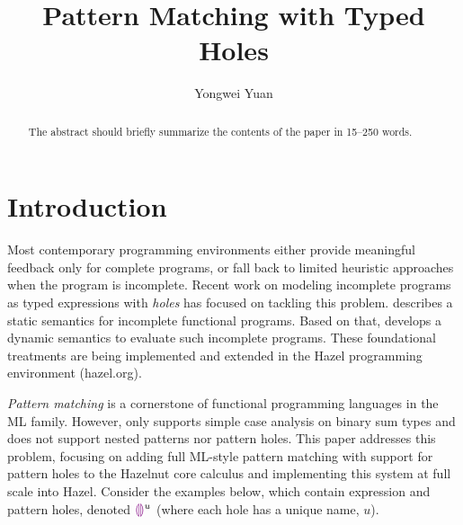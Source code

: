 \documentclass[runningheads,envcountsame,a4paper]{llncs}
\begin{document}
  
\title{Pattern Matching with Typed Holes}

\author{
  Yongwei Yuan \and 
}


\maketitle

\begin{abstract}
  The abstract should briefly summarize the contents of the paper in
  15--250 words.
  
\end{abstract}

\section{Introduction}
\label{sec:intro}
Most contemporary programming environments either provide meaningful feedback only for complete programs, or fall back to limited heuristic approaches when the program is incomplete.
Recent work on modeling incomplete programs as typed expressions with \emph{holes} has focused on tackling this problem. \cite{DBLP:conf/popl/OmarVHAH17} describes a static semantics for incomplete functional programs. Based on that, \cite{DBLP:journals/pacmpl/OmarVCH19} develops a dynamic semantics to evaluate such incomplete programs.
These foundational treatments are being implemented and extended in the Hazel programming environment (hazel.org).

\emph{Pattern matching} is a cornerstone of functional programming languages in the ML family. 
However, \cite{DBLP:journals/pacmpl/OmarVCH19} only supports simple case analysis on binary sum types and does not support nested patterns nor pattern holes.
This paper addresses this problem, focusing on adding full ML-style pattern matching with support for pattern holes to the Hazelnut core calculus and implementing 
this system at full scale into Hazel. Consider the examples below, which contain expression and pattern holes, denoted $\textcolor{violet}{\llparenthesis}\textcolor{violet}{\rrparenthesis}^{u}$ (where each hole has a unique name, $u$). 
\end{document}
